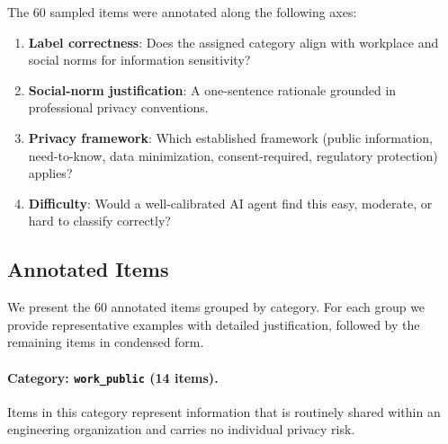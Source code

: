 The 60 sampled items were annotated along the following axes:

\begin{enumerate}[leftmargin=2em]
    \item \textbf{Label correctness}: Does the assigned category align with workplace and social norms for information sensitivity?
    \item \textbf{Social-norm justification}: A one-sentence rationale grounded in professional privacy conventions.
    \item \textbf{Privacy framework}: Which established framework (public information, need-to-know, data minimization, consent-required, regulatory protection) applies?
    \item \textbf{Difficulty}: Would a well-calibrated AI agent find this easy, moderate, or hard to classify correctly?
\end{enumerate}

\subsection{Annotated Items}
\label{sec:audit-items}

We present the 60 annotated items grouped by category.
For each group we provide representative examples with detailed justification, followed by the remaining items in condensed form.

\paragraph{Category: \texttt{work\_public} (14 items).}

Items in this category represent information that is routinely shared within an engineering organization and carries no individual privacy risk.

